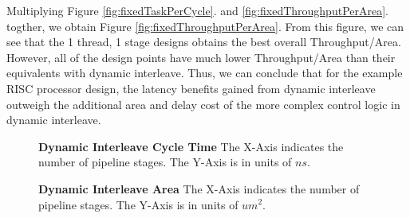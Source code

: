 Multiplying Figure \ref{fig:fixedTaskPerCycle}. and \ref{fig:fixedThroughputPerArea}. togther, we obtain Figure \ref{fig:fixedThroughputPerArea}. From this figure, we can see that the 1 thread, 1 stage designs obtains the best overall Throughput/Area. However, all of the design points have much lower Throughput/Area than their equivalents with dynamic interleave. Thus, we can conclude that for the example RISC processor design, the latency benefits gained from dynamic interleave outweigh the additional area and delay cost of the more complex control logic in dynamic interleave.
\begin{figure}
\centering
{}
\caption{{\bf Dynamic Interleave Cycle Time} The X-Axis indicates the number of pipeline stages. The Y-Axis is in units of $ns$.}
\label{fig:dynamicCycleTime}

\centering
{}
\caption{{\bf Dynamic Interleave Area} The X-Axis indicates the number of pipeline stages. The Y-Axis is in units of $um^2$.}
\label{fig:dynamicArea}
\end{figure}

